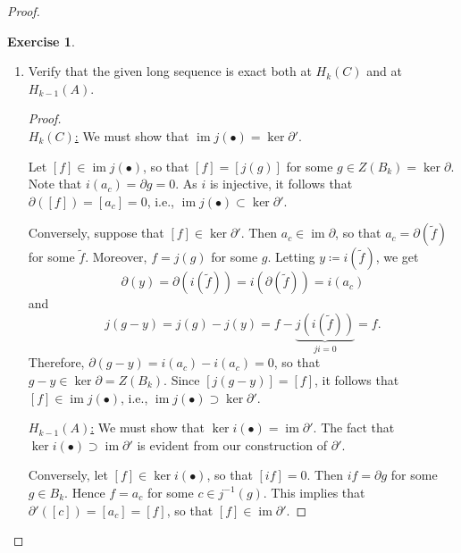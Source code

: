 \documentclass[10pt,letterpaper,cm]{nupset}
\theoremstyle{definition}
\theoremstyle{theorem}
\newtheorem{exercise}[definition]{Exercise}
\theoremstyle{remark}
\newcommand{\1}{\mathbb{1}}
\newcommand{\0}{\vec 0}
\DeclareMathOperator{\im}{im}
\begin{document}
\begin{proof}
\begin{exercise}
\begin{enumerate}
\begin{proof}
\begin{align*}
&  i(a)-\partial{b'} \\
& = \partial{b} -\partial{b'}
\\ & = \partial{b - b'}
\\ & =\partial{i}u
\\ &=  i\partial{u}.
\end{align*}
Therefore, $\partial{b'} =i(a -\partial{u})$. Since $[a] = [a-\partial{u}] $ in $H_{k-1}(A)$, we see that $a$ is independent of our choice of $b$. From now on, we will denote such an $a$ by $a_c$. It is clear that $\partial '$ is also independent of our choice of $c\in \ker{\partial}$ and thus is well-defined. Finally, it is straightforward to check that it is a homomorphism.
\end{proof}
\item Verify that the given long sequence is exact both at $H_k(C)$ and at  $H_{k-1}(A)$.
\begin{proof} $ $
\\
\underline{$H_k(C)$:} 
We must show that $\im{j  (\bullet)} = \ker{\partial '}$. 

Let $[f] \in \im{j  (\bullet)}$, so that $[f] = [j(g)]$ for some $g \in Z(B_k) = \ker{\partial}$.  Note that $i(a_c) = \partial{g} = 0$. As $i$ is injective, it follows that $\partial([f]) = [a_c] =  0$, i.e., $\im{j  (\bullet)} \subset \ker{\partial'}$. 

Conversely, suppose that $[f] \in \ker{\partial'}$. Then $a_c \in \im \partial$, so that $a_c = \partial(\tilde{f})$ for some $\tilde{f}$.  Moreover, $f = j(g)$ for some $g$. Letting $y \coloneqq  i(\tilde{f})$, we get
$$ \partial(y) = \partial( i(\tilde{f}))= i(\partial(\tilde{f})) = i(a_c)$$ and
$$ j( g -y) =j(g) - j(y) =f - \underbrace{j( i(\tilde{f}))}_{ji =0} = f.$$ Therefore, $\partial(g - y) = i(a_c) - i(a_c) =0$, so that $g- y \in \ker \partial = Z(B_k)$. Since $[j  (g-y)] = [f]$, it follows that $[f] \in \im{j  (\bullet)}$, i.e., $ \im{j  (\bullet)} \supset \ker{\partial'}$.

\underline{$H_{k-1}(A)$:} We must show that $\ker{i(\bullet)} =\im{\partial '}$. The fact that $\ker{i(\bullet)} \supset \im{\partial '}$ is evident from our construction of $\partial '$.

Conversely, let $[f]\in \ker{i(\bullet)}$, so that $[if] =0$. Then $if=\partial{g}$ for some $g\in B_k$. Hence $f =a_c$ for some $c\in j^{-1}(g)$. This implies that $\partial'([c])= [a_c] =[f]$, so that $[f]\in \im{\partial '}$.
\end{proof}
\end{enumerate}
\end{exercise}
\end{proof}
\end{document}
